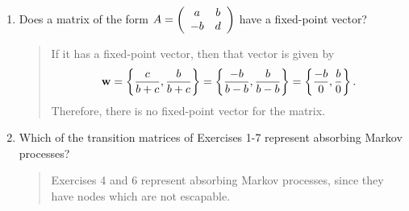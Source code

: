 \documentclass{hw}
\begin{document}
\begin{enumerate}
\item Does a matrix of the form
$\displaystyle A=\left(\begin{array}{c c}a & b \\ -b & d\end{array}\right)$ have a fixed-point vector?
\begin{quote}
If it has a fixed-point vector, then that vector is given by
\[
\mathbf{w}=\left\{ {c\over b+c},{b\over b+c} \right\}
= \left\{ {-b\over b-b},{b\over b-b}\right\}
= \left\{ {-b\over 0},{b\over 0}\right\}.
\]
Therefore, there is no fixed-point vector for the matrix.
\end{quote}

\setcounter{enumi}{31}
\item Which of the transition matrices of Exercises 1-7 represent absorbing Markov processes?
\begin{quote}
Exercises 4 and 6 represent absorbing Markov processes, since they have nodes which are not
escapable.
\end{quote}
\end{enumerate}
\end{document}
